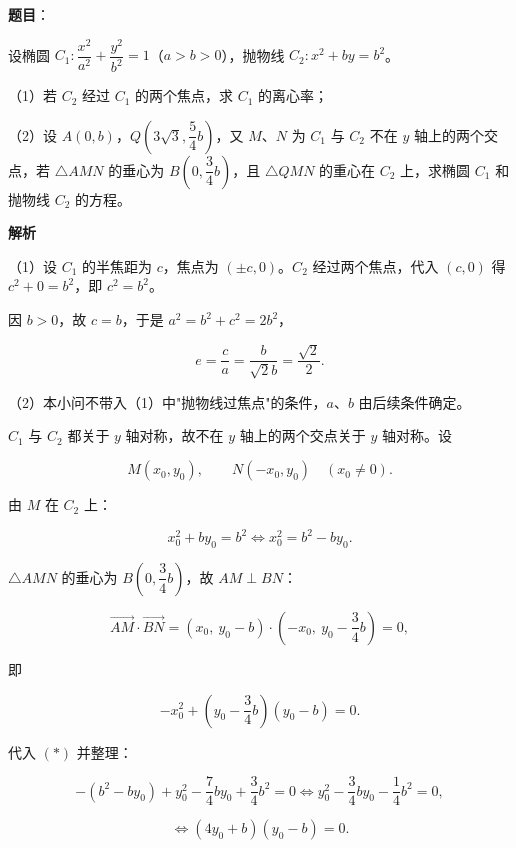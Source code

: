 \begin{answer}

\textbf{题目}：

设椭圆 $C_1:\dfrac{x^2}{a^2}+\dfrac{y^2}{b^2}=1$（$a>b>0$），抛物线 $C_2:x^2+by=b^2$。

（1）若 $C_2$ 经过 $C_1$ 的两个焦点，求 $C_1$ 的离心率；

（2）设 $A(0,b)$，$Q\left(3\sqrt3,\dfrac54b\right)$，又 $M$、$N$ 为 $C_1$ 与 $C_2$ 不在 $y$ 轴上的两个交点，若 $\triangle AMN$ 的垂心为 $B\left(0,\dfrac34b\right)$，且 $\triangle QMN$ 的重心在 $C_2$ 上，求椭圆 $C_1$ 和抛物线 $C_2$ 的方程。
\nopagebreak[4]
\begin{center}\end{center}
\nopagebreak[4]
\textbf{解析}

（1）设 $C_1$ 的半焦距为 $c$，焦点为 $(\pm c,0)$。$C_2$ 经过两个焦点，代入 $(c,0)$ 得 $c^2+0=b^2$，即 $c^2=b^2$。

因 $b>0$，故 $c=b$，于是 $a^2=b^2+c^2=2b^2$，

\nopagebreak[4]
\[e=\frac ca=\frac b{\sqrt2b}=\frac{\sqrt2}2.\]

（2）本小问不带入（1）中"抛物线过焦点"的条件，$a$、$b$ 由后续条件确定。

$C_1$ 与 $C_2$ 都关于 $y$ 轴对称，故不在 $y$ 轴上的两个交点关于 $y$ 轴对称。设

\nopagebreak[4]
\[M(x_0,y_0),\qquad N(-x_0,y_0)\quad(x_0\neq0).\]

由 $M$ 在 $C_2$ 上：

\nopagebreak[4]
\[x_0^2+by_0=b^2\iff x_0^2=b^2-by_0.\tag{$*$}\]

$\triangle AMN$ 的垂心为 $B\left(0,\dfrac34b\right)$，故 $AM\perp BN$：

\nopagebreak[4]
\[\overrightarrow{AM}\cdot\overrightarrow{BN}
=(x_0,\ y_0-b)\cdot\left(-x_0,\ y_0-\frac34b\right)=0,\]

即

\nopagebreak[4]
\[-x_0^2+\left(y_0-\frac34b\right)(y_0-b)=0.\]

代入 $(*)$ 并整理：

\nopagebreak[4]
\[-\left(b^2-by_0\right)+y_0^2-\frac74by_0+\frac34b^2=0
\iff y_0^2-\frac34by_0-\frac14b^2=0,\]

\nopagebreak[4]
\[\iff\left(4y_0+b\right)\left(y_0-b\right)=0.\]


\end{answer}
